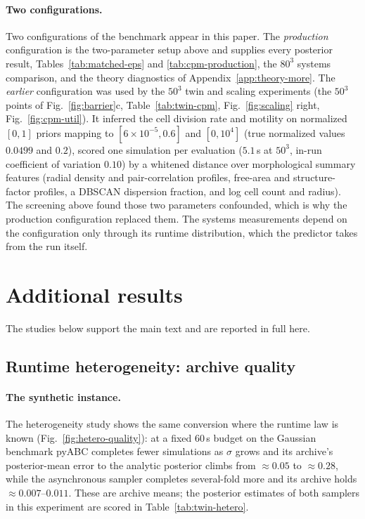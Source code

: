 \documentclass[pdflatex,sn-mathphys-num]{sn-jnl}
\theoremstyle{plain}
\theoremstyle{definition}
\begin{document}
\begin{appendices}
\paragraph{Two configurations.} Two configurations of the benchmark appear in this paper. The \emph{production} configuration is the two-parameter setup above and supplies every posterior result, Tables~\ref{tab:matched-eps} and \ref{tab:cpm-production}, the $80^3$ systems comparison, and the theory diagnostics of Appendix~\ref{app:theory-more}. The \emph{earlier} configuration was used by the $50^3$ twin and scaling experiments (the $50^3$ points of Fig.~\ref{fig:barrier}c, Table~\ref{tab:twin-cpm}, Fig.~\ref{fig:scaling} right, Fig.~\ref{fig:cpm-util}). It inferred the cell division rate and motility on normalized $[0,1]$ priors mapping to $[6{\times}10^{-5},0.6]$ and $[0,10^4]$ (true normalized values $0.0499$ and $0.2$), scored one simulation per evaluation ($5.1$\,s at $50^3$, in-run coefficient of variation $0.10$) by a whitened distance over morphological summary features (radial density and pair-correlation profiles, free-area and structure-factor profiles, a DBSCAN dispersion fraction, and log cell count and radius). The screening above found those two parameters confounded, which is why the production configuration replaced them. The systems measurements depend on the configuration only through its runtime distribution, which the predictor takes from the run itself.

\section{Additional results}\label{app:moved}
The studies below support the main text and are reported in full here.

\subsection{Runtime heterogeneity: archive quality}


\paragraph{The synthetic instance.} The heterogeneity study shows the same conversion where the runtime law is known (Fig.~\ref{fig:hetero-quality}): at a fixed $60$\,s budget on the Gaussian benchmark pyABC completes fewer simulations as $\sigma$ grows and its archive's posterior-mean error to the analytic posterior climbs from ${\approx}0.05$ to ${\approx}0.28$, while the asynchronous sampler completes several-fold more and its archive holds ${\approx}0.007$--$0.011$. These are archive means; the posterior estimates of both samplers in this experiment are scored in Table~\ref{tab:twin-hetero}.


\end{appendices}
\end{document}

